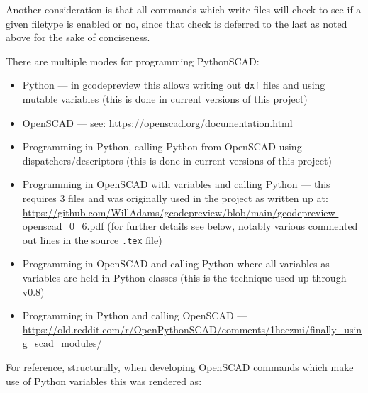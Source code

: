 \documentclass{ltxdoc}
\begin{document}

Another consideration is that all commands which write files will check to see if a given filetype is enabled or no, since that check is deferred to the last as noted above for the sake of conciseness.

There are multiple modes for programming PythonSCAD:

\begin{itemize}
\item Python --- in gcodepreview this allows writing out \verb|dxf| files and using mutable variables (this is done in current versions of this project)
\item OpenSCAD --- see: \url{https://openscad.org/documentation.html}
\item Programming in Python, calling Python from OpenSCAD using dispatchers/descriptors (this is done in current versions of this project) 
\item Programming in OpenSCAD with variables and calling Python --- this requires 3 files and was originally used in the project as written up at: \url{https://github.com/WillAdams/gcodepreview/blob/main/gcodepreview-openscad_0_6.pdf} (for further details see below, notably various commented out lines in the source \verb|.tex| file)
\item Programming in OpenSCAD and calling Python where all variables as variables are held in Python classes (this is the technique used up through v0.8)
\item Programming in Python and calling OpenSCAD --- \url{https://old.reddit.com/r/OpenPythonSCAD/comments/1heczmi/finally_using_scad_modules/}
\end{itemize}

For reference, structurally, when developing OpenSCAD commands which make use of Python variables this was rendered as:
\end{document}
